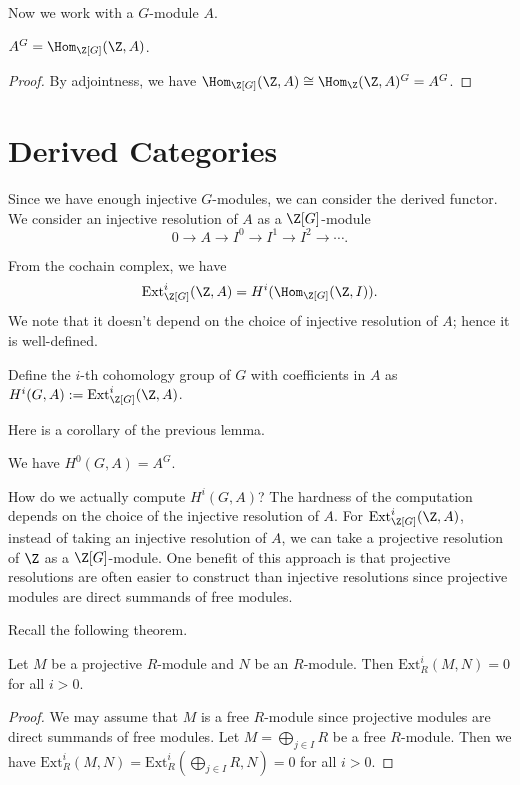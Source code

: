 Now we work with a $G$-module $A$.
\begin{lemma}
    $A^G = \Hom_{\Z[G]}(\Z, A)$.
\end{lemma}
\begin{proof}
    By adjointness, we have $\Hom_{\Z[G]}(\Z, A) \cong \Hom_{\Z}(\Z, A)^G = A^G$.
\end{proof}

\newpage
\section{Derived Categories}
Since we have enough injective $G$-modules, we can consider the derived functor.
We consider an injective resolution of $A$ as a $\Z[G]$-module
\[
    0 \to A \to I^0 \to I^1 \to I^2 \to \cdots.
\]

From the cochain complex,
we have 
\[
\mathrm{Ext}^i_{\Z[G]}(\Z, A) = H^i(\Hom_{\Z[G]}(\Z, I)).
\]
We note that it doesn't depend on the choice of injective resolution of $A$;
hence it is well-defined.

\begin{definition}
    Define the $i$-th cohomology group of $G$ with coefficients in $A$ as
    $H^i(G, A) := \mathrm{Ext}^i_{\Z[G]}(\Z, A)$.
\end{definition}

Here is a corollary of the previous lemma.
\begin{corollary}
    We have $H^0(G, A) = A^G$.
\end{corollary}

How do we actually compute $H^i(G, A)$?
The hardness of the computation depends on the choice of the injective resolution of $A$.
For $\mathrm{Ext}^i_{\Z[G]}(\Z, A)$,
instead of taking an injective resolution of $A$,
we can take a projective resolution of $\Z$ as a $\Z[G]$-module.
One benefit of this approach is that
projective resolutions are often easier to construct than injective resolutions
since projective modules are direct summands of free modules.

Recall the following theorem.
\begin{theorem}
    Let $M$ be a projective $R$-module and $N$ be an $R$-module.
    Then $\mathrm{Ext}^i_R(M, N) = 0$ for all $i > 0$.
\end{theorem}
\begin{proof}
    We may assume that $M$ is a free $R$-module since projective modules are direct summands of free modules.
    Let $M = \bigoplus_{j \in I} R$ be a free $R$-module.
    Then we have
    \(
        \mathrm{Ext}^i_R(M, N) = \mathrm{Ext}^i_R\left(\bigoplus_{j \in I} R, N\right) = 0
    \)
    for all $i > 0$.
\end{proof}


